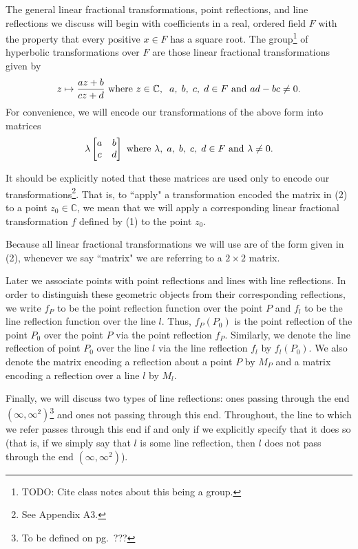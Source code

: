\documentclass[12pt]{article}
\newcommand{\C}{\mathbb{C}}
\newcommand{\ttc}{, \hspace{1mm}}
\newcommand{\lftmat}[4]{\begin{bmatrix} {#1} & {#2} \\ {#3} & {#4} \end{bmatrix}}
\newcommand{\stanlftmat}{\lftmat{a}{b}{c}{d}}
\theoremstyle{plain}
\theoremstyle{definition}
\begin{document}
The general linear fractional transformations, point reflections, and line reflections we discuss will begin with coefficients in a real, ordered field $F$ with the property that every positive $x \in F$ has a square root. The group\footnote{TODO: Cite class notes about this being a group.} of hyperbolic transformations over $F$ are those linear fractional transformations given by
\begin{equation} 
	z \mapsto \frac{az+b}{cz+d} \text{ where } z \in \C, \hspace{2mm} a \ttc b \ttc c \ttc d \in F \text{ and } ad-bc \neq 0. 
\end{equation}
For convenience, we will encode our transformations of the above form into matrices
\begin{equation}
	\lambda \stanlftmat \text{ where } \lambda \ttc a \ttc b \ttc c \ttc d \in F \text{ and } \lambda \neq 0. 
\end{equation}

It should be explicitly noted that these matrices are used only to encode our transformations\footnote{See Appendix A3.}. That is, to ``apply" a transformation encoded the matrix in (2) to a point $z_0 \in \C$, we mean that we will apply a corresponding linear fractional transformation $f$ defined by (1) to the point $z_0$. 

Because all linear fractional transformations we will use are of the form given in (2), whenever we say ``matrix" we are referring to a $2 \times 2$ matrix. 

Later we associate points with point reflections and lines with line reflections. In order to distinguish these geometric objects from their corresponding reflections, we write $f_P$ to be the point reflection function over the point $P$ and $f_l$ to be the line reflection function over the line $l$. Thus, $f_P(P_0)$ is the point reflection of the point $P_0$ over the point $P$ via the point reflection $f_P$. Similarly, we denote the line reflection of point $P_0$ over the line $l$ via the line reflection $f_l$ by $f_l(P_0)$. We also denote the matrix encoding a reflection about a point $P$ by $M_P$ and a matrix encoding a reflection over a line $l$ by $M_l$. 

Finally, we will discuss two types of line reflections: ones passing through the end $(\infty, \infty^2)$\footnote{To be defined on pg.~???} and ones not passing through this end. Throughout, the line to which we refer passes through this end if and only if we explicitly specify that it does so (that is, if we simply say that $l$ is some line reflection, then $l$ does not pass through the end $(\infty, \infty^2)$).
\end{document}
